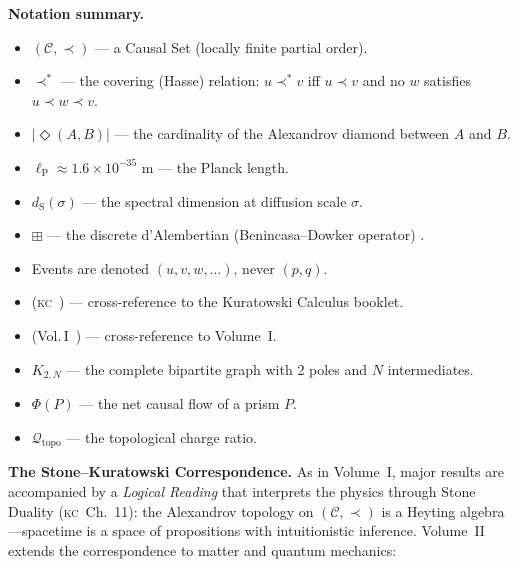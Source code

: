 \documentclass[11pt, a4paper, openany]{book}
\newcommand{\lP}{\ell_{\mathrm{P}}}
\newcommand{\dS}{d_{\mathrm{S}}}
\newcommand{\covers}{\prec^*}              %
\newcommand{\diam}[2]{|\Diamond(#1,#2)|}   %
\newcommand{\boxlayer}{\boxplus}            %
\newcommand{\KC}[1]{\textnormal{(\textsc{kc}~#1)}}
\newcommand{\VolI}[1]{\textnormal{(Vol.\,I~#1)}}
\begin{document}
\medskip\noindent
\textbf{Notation summary.}
\begin{itemize}
  \item $(\mathcal{C}, \prec)$ --- a Causal Set (locally finite partial order).
  \item $\covers$ --- the covering (Hasse) relation: $u \covers v$ iff $u \prec v$ and no $w$ satisfies $u \prec w \prec v$.
  \item $\diam{A}{B}$ --- the cardinality of the Alexandrov diamond between $A$ and $B$.
  \item $\lP \approx 1.6 \times 10^{-35}$ m --- the Planck length.
  \item $\dS(\sigma)$ --- the spectral dimension at diffusion scale $\sigma$.
  \item $\boxlayer$ --- the discrete d'Alembertian (Benincasa--Dowker operator) \cite{benincasa2010}.
  \item Events are denoted $(u, v, w, \ldots)$, never $(p, q)$.
  \item \KC{} --- cross-reference to the Kuratowski Calculus booklet.
  \item \VolI{} --- cross-reference to Volume~I.
  \item $K_{2,N}$ --- the complete bipartite graph with 2 poles and $N$ intermediates.
  \item $\Phi(P)$ --- the net causal flow of a prism $P$.
  \item $\mathcal{Q}_{\mathrm{topo}}$ --- the topological charge ratio.
\end{itemize}

\medskip\noindent
\textbf{The Stone--Kuratowski Correspondence.}
As in Volume~I, major results are accompanied by a \emph{Logical Reading} that interprets the physics through Stone Duality \cite{stone1936} \KC{Ch.~11}: the Alexandrov topology on $(\mathcal{C}, \prec)$ is a Heyting algebra---spacetime is a space of propositions with intuitionistic inference. Volume~II extends the correspondence to matter and quantum mechanics:
\end{document}
